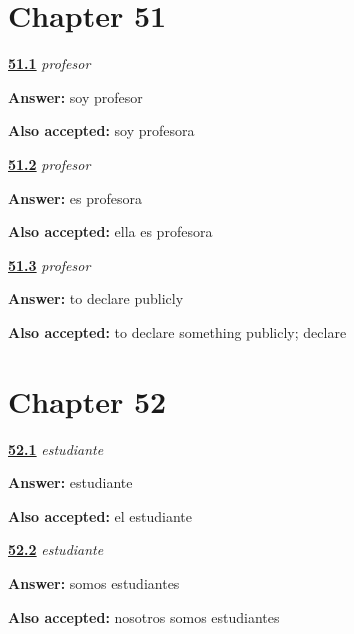 \section*{Chapter 51}

\noindent\begin{minipage}[t]{\linewidth}
\raggedright
\hyperlink{review-ES-C09-profesor-say}{\textbf{51.1}} \emph{profesor}\par
\small \textbf{Answer:} soy profesor\par
\footnotesize \textbf{Also accepted:} soy profesora
\end{minipage}\par\medskip

\noindent\begin{minipage}[t]{\linewidth}
\raggedright
\hyperlink{review-ES-C09-profesor-she}{\textbf{51.2}} \emph{profesor}\par
\small \textbf{Answer:} es profesora\par
\footnotesize \textbf{Also accepted:} ella es profesora
\end{minipage}\par\medskip

\noindent\begin{minipage}[t]{\linewidth}
\raggedright
\hyperlink{review-ES-C09-profesor-cousin}{\textbf{51.3}} \emph{profesor}\par
\small \textbf{Answer:} to declare publicly\par
\footnotesize \textbf{Also accepted:} to declare something publicly; declare
\end{minipage}\par\medskip

\section*{Chapter 52}

\noindent\begin{minipage}[t]{\linewidth}
\raggedright
\hyperlink{review-ES-C09-estudiante-build}{\textbf{52.1}} \emph{estudiante}\par
\small \textbf{Answer:} estudiante\par
\footnotesize \textbf{Also accepted:} el estudiante
\end{minipage}\par\medskip

\noindent\begin{minipage}[t]{\linewidth}
\raggedright
\hyperlink{review-ES-C09-estudiante-we}{\textbf{52.2}} \emph{estudiante}\par
\small \textbf{Answer:} somos estudiantes\par
\footnotesize \textbf{Also accepted:} nosotros somos estudiantes
\end{minipage}\par\medskip

